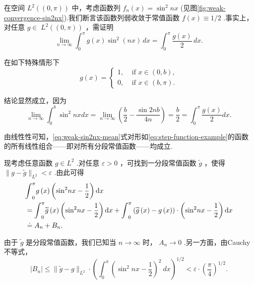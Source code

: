 \begin{instance}\label{ins:weak-convergence-sin2nx}
在空间 ${L}^{2}\left( \left(  {0,\pi }\right)  \right)$ 中，考虑函数列 ${f}_{n}\left( x\right)  = {\sin }^{2}{nx}$ (见图\ref{fig:weak-convergence-sin2nx}).我们断言该函数列弱收敛于常值函数 $f\left( x\right)  \equiv  1/2$ .事实上，对任意 $g \in \; {L}^{2}\left( \left(  {0,\pi }\right)  \right)$ ，需证明
\begin{equation}\tag{5.26}\label{eq:weak-sin2nx-mean}
\mathop{\lim }\limits_{{n \rightarrow  \infty }}{\int }_{0}^{\pi }g\left( x\right) {\sin }^{2}\left( nx\right) \,dx = {\int }_{0}^{\pi }\frac{g\left( x\right) }{2}\,dx.
\end{equation}

在如下特殊情形下
\begin{equation}\tag{5.27}\label{eq:step-function-example}
g\left( x\right)  = \begin{cases}
1, & \text{ if }x \in  \left(  {0,b}\right), \\
0, & \text{ if }x \in  \left( b,\pi \right).
\end{cases}
\end{equation}

结论显然成立，因为
\[
\mathop{\lim }\limits_{{n \rightarrow  \infty }}{\int }_{0}^{b}{\sin }^{2}{nxdx} = \mathop{\lim }\limits_{{n \rightarrow  \infty }}\left( {\frac{b}{2} - \frac{\sin {2nb}}{4n}}\right)  = \frac{b}{2} = {\int }_{0}^{\pi }\frac{g\left( x\right) }{2}{dx}.
\]

由线性性可知，\eqref{eq:weak-sin2nx-mean}式对形如\eqref{eq:step-function-example}的函数的所有线性组合——即对所有分段常值函数——均成立.

现考虑任意函数 $g \in  {L}^{2}$ .对任意 $\varepsilon  > 0$ ，可找到一分段常值函数 $\widetilde{g}$ ，使得 $\| g - \widetilde{g}{\| }_{{L}^{2}} < \varepsilon$ .由此可得
\begin{align*}
    &{\int }_{0}^{\pi }g\left( x\right) \left( {{\sin }^{2}{nx} - \frac{1}{2}}\right) {\mathop{}\!\mathrm{d} x}\\
    &= {\int }_{0}^{\pi }\widetilde{g}\left( x\right) \left( {{\sin }^{2}{nx} - \frac{1}{2}}\right) {\mathop{}\!\mathrm{d} x} + {\int }_{0}^{\pi }\left(  {\widetilde{g}\left( x\right)  - g\left( x\right) }\right)   \cdot  \left( {{\sin }^{2}{nx} - \frac{1}{2}}\right) {\mathop{}\!\mathrm{d} x}\\
    &\doteq  {A}_{n} + {B}_{n}.
\end{align*}

由于 $\widetilde{g}$ 是分段常值函数，我们已知当 $n \rightarrow  \infty$ 时， ${A}_{n} \rightarrow  0$ .另一方面，由Cauchy不等式，
\[
\left| {B}_{n}\right|  \leq  \| \widetilde{g} - g{\| }_{{L}^{2}} \cdot  {\left( {\int }_{0}^{\pi }{\left( {\sin }^{2}nx - \frac{1}{2}\right) }^{2}\ d x\right) }^{1/2} < \varepsilon  \cdot  {\left( \frac{\pi }{4}\right) }^{1/2}.
\]


\end{instance}
